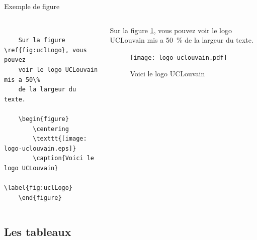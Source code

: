 \begin{frame}[fragile]{Exemple de figure}
  \begin{columns}
    \begin{column}{0.5\textwidth}
    \begin{lstlisting}[style=nonumbers]

    Sur la figure \ref{fig:uclLogo}, vous pouvez
    voir le logo UCLouvain mis a 50\%
    de la largeur du texte.

    \begin{figure}
        \centering
        \texttt{[image: logo-uclouvain.eps]}
        \caption{Voici le logo UCLouvain}
        \label{fig:uclLogo}
    \end{figure}
    \end{lstlisting}
    \end{column}
    \begin{column}{0.5\textwidth}
    Sur la figure \ref{fig:uclLogo}, vous pouvez voir le logo UCLouvain
    mis a \SI{50}{\percent} de la largeur du texte.

    \begin{figure}[!ht]
        \centering
        \texttt{[image: logo-uclouvain.pdf]}
        \caption{Voici le logo UCLouvain}
        \label{fig:uclLogo}
    \end{figure}
    \end{column}
  \end{columns}
\end{frame}

\subsection{Les tableaux}

